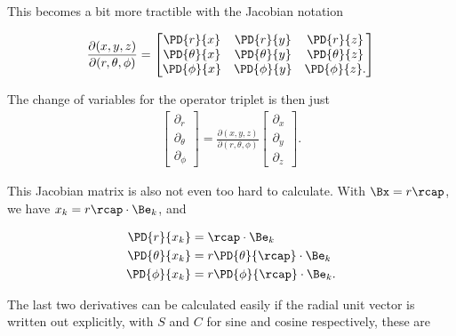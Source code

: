 This becomes a bit more tractible with the Jacobian notation

\begin{align}\label{eqn:jacobianSphericalPolar:3}
\frac{\partial (x,y,z)}{\partial (r,\theta,\phi)}
=
\begin{bmatrix}
\PD{r}{x} &\PD{r}{y} &\PD{r}{z}  \\
\PD{\theta}{x} &\PD{\theta}{y} &\PD{\theta}{z}  \\
\PD{\phi}{x} &\PD{\phi}{y} &\PD{\phi}{z}.
\end{bmatrix}
\end{align}

The change of variables for the operator triplet is then just
\begin{align}\label{eqn:jacobianSphericalPolar:4}
\begin{bmatrix}
\partial_r \\
\partial_\theta \\
\partial_\phi
\end{bmatrix}
= 
\frac{\partial (x,y,z)}{\partial (r,\theta,\phi)}
\begin{bmatrix}
\partial_x \\
\partial_y \\
\partial_z
\end{bmatrix}.
\end{align}

This Jacobian matrix is also not even too hard to calculate.  With $\Bx = r \rcap$, we have $x_k = r \rcap \cdot \Be_k$, and

\begin{subequations}
\begin{align}\label{eqn:jacobianSphericalPolar:5}
\PD{r}{x_k} &= \rcap \cdot \Be_k \\
\PD{\theta}{x_k} &= r \PD{\theta}{\rcap} \cdot \Be_k \\
\PD{\phi}{x_k} &= r \PD{\phi}{\rcap} \cdot \Be_k.
\end{align}
\end{subequations}

The last two derivatives can be calculated easily if the radial unit vector is written out explicitly, with $S$ and $C$ for sine and cosine respectively, these are

